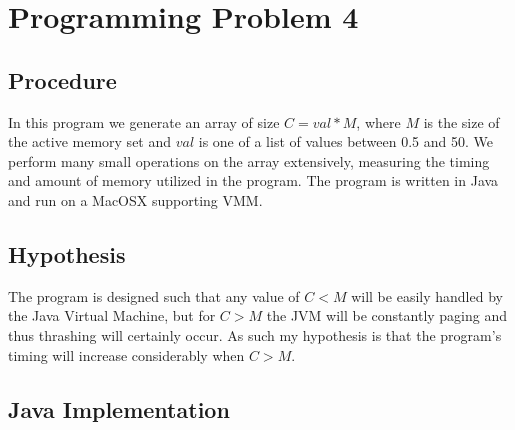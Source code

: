 \documentclass[11pt]{article}
\begin{document}
\section*{Programming Problem 4}

\subsection*{Procedure}

In this program we generate an array of size $C=val*M$, where $M$ is the size of the active memory set and $val$ is one of a list of values between 0.5 and 50. We perform many small operations on the array extensively, measuring the timing and amount of memory utilized in the program. The program is written in Java and run on a MacOSX supporting VMM.

\subsection*{Hypothesis}

The program is designed such that any value of $C<M$ will be easily handled by the Java Virtual Machine, but for $C>M$ the JVM will be constantly paging and thus thrashing will certainly occur. As such my hypothesis is that the program's timing will increase considerably when $C>M$.

\subsection*{Java Implementation}
\end{document}
